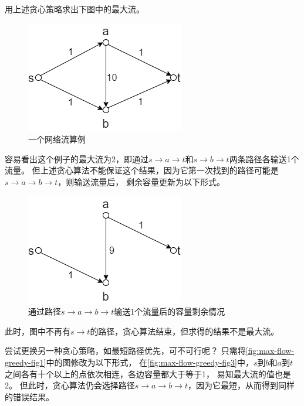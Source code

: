 \begin{example}
	用上述贪心策略求出下图中的最大流。

	\begin{figure}[hbt]
		\centering
		\includegraphics[scale=0.5]{image/network-flow-greedy-example.png}
		\caption{一个网络流算例}
	\end{figure}\label{fig:max-flow-greedy-fig1}
	\par 容易看出这个例子的最大流为2，即通过\(s \to a \to t\)和\(s \to b \to t\)两条路径各输送1个流量。
	但上述贪心算法不能保证这个结果，因为它第一次找到的路径可能是\(s \to a \to b \to t\)，则输送流量后，
	剩余容量更新为以下形式。

	\begin{figure}[hbt]
		\centering
		\includegraphics[scale=0.5]{image/network-flow-greedy-example2.png}
		\caption{通过路径\(s \to a \to b \to t\)输送1个流量后的容量剩余情况}\label{fig:max-flow-greedy-fig2}
	\end{figure}
	\par 此时，图中不再有\(s \to t\)的路径，贪心算法结束，但求得的结果不是最大流。

\end{example}

	\par 尝试更换另一种贪心策略，如最短路径优先，可不可行呢？
	只需将\autoref{fig:max-flow-greedy-fig1}中的图修改为以下形式，
	在\autoref{fig:max-flow-greedy-fig3}中，\(s\)到\(b\)和\(a\)到\(t\)之间各有十个以上的点依次相连，各边容量都大于等于1，
	易知最大流的值也是2。
	但此时，贪心算法仍会选择路径\(s \to a \to b \to t\)，因为它最短，从而得到同样的错误结果。

